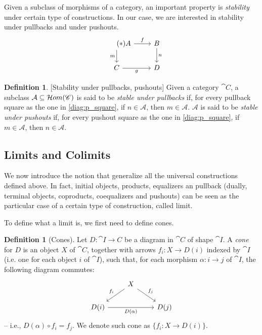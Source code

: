\documentclass[a4paper, twoside,openright]{report}
\theoremstyle{plain}
\theoremstyle{definition}
\newtheorem{definition}[theorem]{Definition}
\begin{document}
Given a subclass of morphisms of a category, an important property is \emph{stability} under certain type of constructions. In our case, we are interested in stability under pullbacks and under pushouts.
\[
    \begin{tikzcd}\label{diag:p_square}\tag{$\ast$}
        A \arrow[r, "f"] \arrow[d, "m"swap] & B \arrow[d, "n"] \\
        C \arrow[r, "g" swap] & D
    \end{tikzcd}
\]
\begin{definition}\label{def:stab_under_pb_po}[Stability under pullbacks, pushouts]
    Given a category $\cat C$, a subclass $\mathcal{A} \subseteq \mathcal{H}om(\mathscr{C})$ is said to be \emph{stable under pullbacks} if, for every pullback square as the one in \eqref{diag:p_square}, if $n \in \mathcal{A}$, then $m \in \mathcal{A}$.
    $\mathcal A$ is said to be \emph{stable under pushouts} if, for every pushout square as the one in \eqref{diag:p_square}, if $m \in \mathcal{A}$, then $n \in \mathcal{A}$.
\end{definition}

\subsection{Limits and Colimits}

We now introduce the notion that generalize all the universal constructions defined above. In fact, initial objects, products, equalizers an pullback (dually, terminal objects, coproducts, coequalizers and pushouts) can be seen as the particular case of a certain type of construction, called limit.

To define what a limit is, we first need to define cones.

\begin{definition}[Cones]
    Let $D:\cat {I \rightarrow C}$ be a diagram in $\cat C$ of shape $\cat I$. A \emph{cone} for $D$ is an object $X$ of $\cat C$, together with arrows $f_i : X \rightarrow D(i)$ indexed by $\cat I$ (i.e. one for each object $i$ of $\cat I$), such that, for each morphism $\alpha: i \rightarrow j$ of $\cat I$, the following diagram commutes:
    \[
        \begin{tikzcd}
            & X \arrow[dl, "{f_i}"swap] \arrow[dr, "{f_j}"] & \\
            D(i) \arrow[rr, "{D(\alpha)}" swap] & & D(j)
        \end{tikzcd}
    \]
    -- i.e., $D(\alpha) \circ f_i = f_j$.
    We denote such cone as $\{f_i: X \rightarrow D(i)\}$.

\end{definition}
\end{document}
